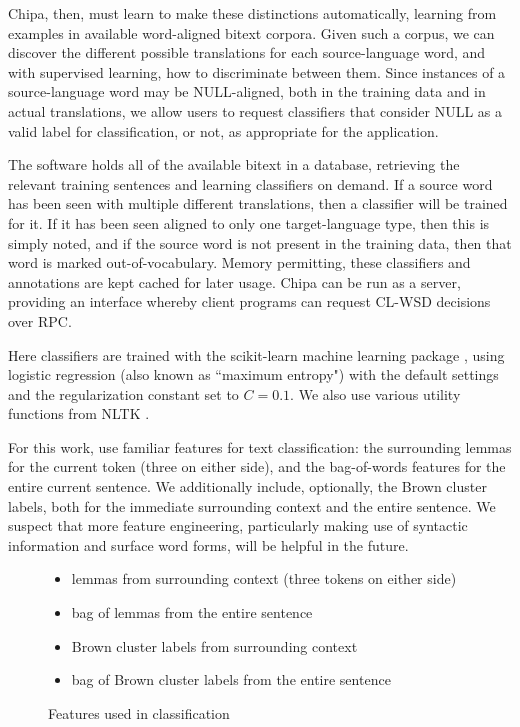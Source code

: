 \documentclass[10pt, a4paper]{article}
\begin{document}
Chipa, then, must learn to make these distinctions automatically, learning from
examples in available word-aligned bitext corpora. Given such a corpus, we can
discover the different possible translations for each source-language word, and
with supervised learning, how to discriminate between them.  Since instances of
a source-language word may be NULL-aligned, both in the training data and in
actual translations, we allow users to request classifiers that consider NULL
as a valid label for classification, or not, as appropriate for the
application.

The software holds all of the available bitext in a database, retrieving the
relevant training sentences and learning classifiers on demand.
If a source word has been seen with multiple different translations, then a
classifier will be trained for it. If it has been seen aligned to only one
target-language type, then this is simply noted, and if the source word is not
present in the training data, then that word is marked out-of-vocabulary.
Memory permitting, these classifiers and annotations are kept cached for later
usage. Chipa can be run as a server, providing an interface whereby client
programs can request CL-WSD decisions over RPC.

Here classifiers are trained with the scikit-learn machine learning package
\cite{scikit-learn}, using logistic regression (also known as ``maximum
entropy") with the default settings and the regularization constant set to
$C=0.1$. We also use various utility functions from NLTK \cite{nltkbook}. 

For this work, use familiar features for text classification: the
surrounding lemmas for the current token (three on either side), and the
bag-of-words features for the entire current sentence. We additionally include,
optionally, the Brown cluster labels, both for the immediate surrounding context
and the entire sentence.
We suspect that more feature engineering, particularly making use of syntactic
information and surface word forms, will be helpful in the future.

\begin{figure}[t!]
  \begin{itemize}
    \item lemmas from surrounding context (three tokens on either side)
    \item bag of lemmas from the entire sentence
    \item Brown cluster labels from surrounding context
    \item bag of Brown cluster labels from the entire sentence
  \end{itemize}
\caption{Features used in classification}
\label{fig:features}
\end{figure}
\end{document}
